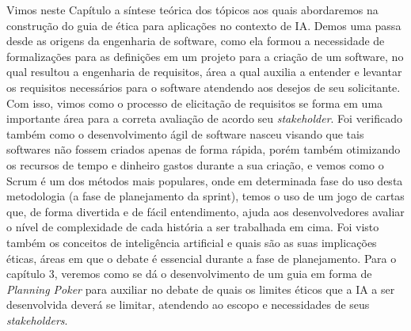 Vimos neste Capítulo a síntese teórica dos tópicos aos quais abordaremos na construção do guia de ética para aplicações no contexto de \acrshort{IA}. Demos uma passa desde as origens da engenharia de software, como ela formou a necessidade de formalizações para as definições em um projeto para a criação de um software, no qual resultou a engenharia de requisitos, área a qual auxilia a entender e levantar os requisitos necessários para o software atendendo aos desejos de seu solicitante. Com isso, vimos como o processo de elicitação de requisitos se forma em uma importante área para a correta avaliação de acordo seu \textit{stakeholder}. Foi verificado também como o desenvolvimento ágil de software nasceu visando que tais softwares não fossem criados apenas de forma rápida, porém também otimizando os recursos de tempo e dinheiro gastos durante a sua criação, e vemos como o Scrum é um dos métodos mais populares, onde em determinada fase do uso desta metodologia (a fase de planejamento da sprint), temos o uso de um jogo de cartas que, de forma divertida e de fácil entendimento, ajuda aos desenvolvedores avaliar o nível de complexidade de cada história a ser trabalhada em cima. Foi visto também os conceitos de inteligência artificial e quais são as suas implicações éticas, áreas em que o debate é essencial durante a fase de planejamento. Para o capítulo 3, veremos como se dá o desenvolvimento de um guia em forma de \textit{Planning Poker} para auxiliar no debate de quais os limites éticos que a \acrshort{IA} a ser desenvolvida deverá se limitar, atendendo ao escopo e necessidades de seus \textit{stakeholders}.











